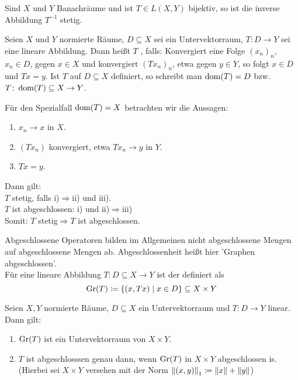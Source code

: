 \begin{korollar}
	Sind $ X $ und $ Y $ Banachr\"aume und ist $ T\in L(X,Y) $ bijektiv, so ist die inverse Abbildung $ T^{-1} $ stetig.
\end{korollar}
\begin{definition}
	Seien $ X $ und $ Y $ normierte R\"aume, $ D\subseteq X $ sei ein Untervektorraum, $ T\colon D\rightarrow Y $ sei eine lineare Abbildung. Dann hei\ss t $ T $ , falls: Konvergiert eine Folge $ (x_n)_n $, $ x_n\in D $, gegen $ x\in X $ und konvergiert $ (Tx_n)_n $, etwa gegen $ y\in Y $, so folgt $ x\in D $ und $ Tx=y $. Ist $ T $ auf $ D\subseteq X $ definiert, so schreibt man $ \operatorname{dom}(T)=D $ bzw. $ T\colon\operatorname{dom}(T)\subseteq X\rightarrow Y $. 
\end{definition}
\begin{bemerkung*}
	F\"ur den Spezialfall $ \operatorname{dom}(T)=X $ betrachten wir die Aussagen:
	\begin{enumerate}
		\item $ x_n\rightarrow x $ in $ X $.
		\item $ (Tx_n) $ konvergiert, etwa $ Tx_n\rightarrow y $ in $ Y $.
		\item $ Tx=y $.
	\end{enumerate}
	Dann gilt:\\
	$ T $ stetig, falls i)$ \Rightarrow $ii) und iii).\\
	$ T $ ist abgeschlossen: i) und ii)$ \Rightarrow $iii)\\
	Somit: $ T $ stetig$ \Rightarrow T$ ist abgeschlossen.
\end{bemerkung*}
\begin{bemerkung*}
	Abgeschlossene Operatoren bilden im Allgemeinen nicht abgeschlossene Mengen auf abgeschlossene Mengen ab. Abgeschlossenheit hei\ss t hier 'Graphen abgeschlossen'.\\
	F\"ur eine lineare Abbildung $ T\colon D\subseteq X\rightarrow Y $ ist der  definiert als
	\[ \operatorname{Gr}(T)\coloneqq\lbrace (x,Tx)\mid x\in D\rbrace\subseteq X\times Y \] 
\end{bemerkung*}
\begin{lemma}
	Seien $ X,Y $ normierte R\"aume, $ D\subseteq X $ ein Untervektorraum und $ T\colon D\rightarrow Y $ linear. Dann gilt:
	\begin{enumerate}
		\item $ \operatorname{Gr}(T) $ ist ein Untervektorraum von $ X\times Y $.
		\item $ T $ ist abgeschlosssen genau dann, wenn $ \operatorname{Gr}(T) $ in $ X\times Y $ abgeschlossen is. (Hierbei sei $ X\times Y $ versehen mit der Norm $ \left\|(x,y)\right\|_1\coloneqq\left\|x\right\|+\left\|y\right\| $) 
	\end{enumerate}
\end{lemma}
